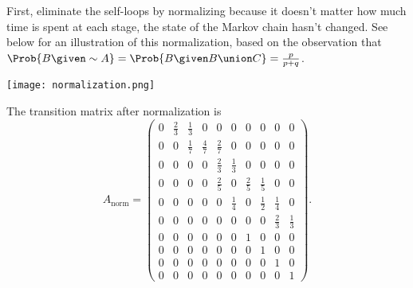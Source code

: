 \documentclass[12pt]{article}
\begin{document}
\begin{solution}
\begin{enumerate}[label=(\alph*)]
        First, eliminate the self-loops by normalizing because it
        doesn't matter how much time is spent at each stage, the state
        of the Markov chain hasn't changed.  See below for an
        illustration of this normalization, based on the observation
        that \( \Prob{B \given \sim A} = \Prob{B \given B \union C} =
        \frac{p} {p+q} \).

        \texttt{[image: normalization.png]}

        The transition matrix after normalization is
        \[
            A_{\text{norm}} =
            \begin{pmatrix}
                0 & \frac{2}{3} & \frac{1}{3} & 0 & 0 & 0 & 0 & 0 & 0 &
                0\\
                0 & 0 & \frac{1}{7} & \frac{4}{7} & \frac{2}{7} & 0 & 0
                & 0 & 0 & 0\\
                0 & 0 & 0 & 0 & \frac{2}{3} & \frac{1}{3} & 0 & 0 & 0 &
                0\\
                0 & 0 & 0 & 0 & \frac{2}{5} & 0 & \frac{2}{5} & \frac{1}
                {5} & 0 & 0\\
                0 & 0 & 0 & 0 & 0 & \frac{1}{4} & 0 & \frac{1}{2} &
                \frac{1}{4} & 0\\
                0 & 0 & 0 & 0 & 0 & 0 & 0 & 0 & \frac{2}{3} & \frac{1}{3}\\
                0 & 0 & 0 & 0 & 0 & 0 & 1 & 0 & 0 & 0\\
                0 & 0 & 0 & 0 & 0 & 0 & 0 & 1 & 0 & 0\\
                0 & 0 & 0 & 0 & 0 & 0 & 0 & 0 & 1 & 0\\
                0 & 0 & 0 & 0 & 0 & 0 & 0 & 0 & 0 & 1
            \end{pmatrix}
            .
        \]


\end{enumerate}
\end{solution}
\end{document}
